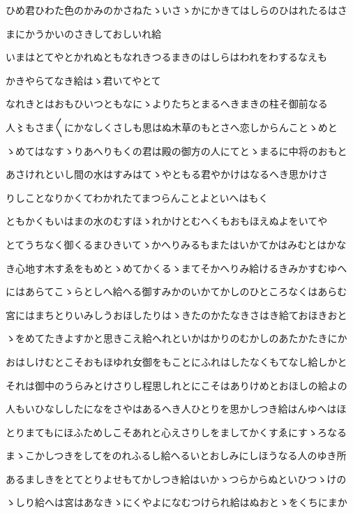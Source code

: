 \documentclass[a4paper,11pt,landscape]{ltjtarticle}
\begin{document}
\par\medskip
ひめ君ひわた色のかみのかさねたゝいさゝかにかきてはしらのひはれたるはさ
\par\medskip
まにかうかいのさきしておしいれ給
\par\medskip
いまはとてやとかれぬともなれきつるまきのはしらはわれをわするなえも
\par\medskip
かきやらてなき給はゝ君いてやとて
\par\medskip
なれきとはおもひいつともなにゝよりたちとまるへきまきの柱そ御前なる
\par\medskip
人〻もさま〱にかなしくさしも思はぬ木草のもとさへ恋しからんことゝめと
\par\medskip
ゝめてはなすゝりあへりもくの君は殿の御方の人にてとゝまるに中将のおもと
\par\medskip
あさけれといし間の水はすみはてゝやともる君やかけはなるへき思かけさ
\par\medskip
りしことなりかくてわかれたてまつらんことよといへはもく
\par\medskip
ともかくもいはまの水のむすほゝれかけとむへくもおもほえぬよをいてや
\par\medskip
とてうちなく御くるまひきいてゝかへりみるもまたはいかてかはみむとはかな
\par\medskip
き心地す木すゑをもめとゝめてかくるゝまてそかへりみ給けるきみかすむゆへ
\par\medskip
にはあらてこゝらとしへ給へる御すみかのいかてかしのひところなくはあらむ
\par\medskip
宮にはまちとりいみしうおほしたりはゝきたのかたなきさはき給ておほきおと
\par\medskip
ゝをめてたきよすかと思きこえ給へれといかはかりのむかしのあたかたきにか
\par\medskip
おはしけむとこそおもほゆれ女御をもことにふれはしたなくもてなし給しかと
\par\medskip
それは御中のうらみとけさりし程思しれとにこそはありけめとおほしの給よの
\par\medskip
人もいひなししたになをさやはあるへき人ひとりを思かしつき給はんゆへはほ
\par\medskip
とりまてもにほふためしこそあれと心えさりしをましてかくすゑにすゝろなる
\par\medskip
まゝこかしつきをしてをのれふるし給へるいとおしみにしほうなる人のゆき所
\par\medskip
あるましきをとてとりよせもてかしつき給はいかゝつらからぬといひつゝけの
\par\medskip
ゝしり給へは宮はあなきゝにくやよになむつけられ給はぬおとゝをくちにまか
\end{document}
